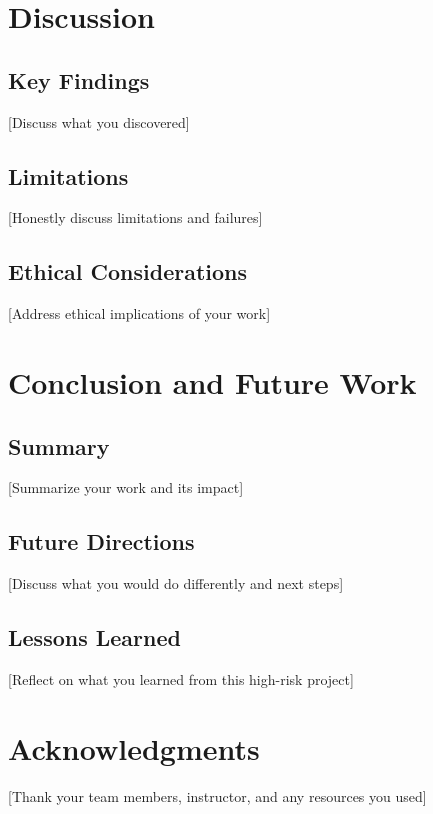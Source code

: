\documentclass[sigconf]{acmart}
\begin{document}
\section{Discussion}
\label{sec:discussion}

\subsection{Key Findings}
[Discuss what you discovered]

\subsection{Limitations}
[Honestly discuss limitations and failures]

\subsection{Ethical Considerations}
[Address ethical implications of your work]

\section{Conclusion and Future Work}
\label{sec:conclusion}

\subsection{Summary}
[Summarize your work and its impact]

\subsection{Future Directions}
[Discuss what you would do differently and next steps]

\subsection{Lessons Learned}
[Reflect on what you learned from this high-risk project]

\section*{Acknowledgments}
[Thank your team members, instructor, and any resources you used]



\end{document}
